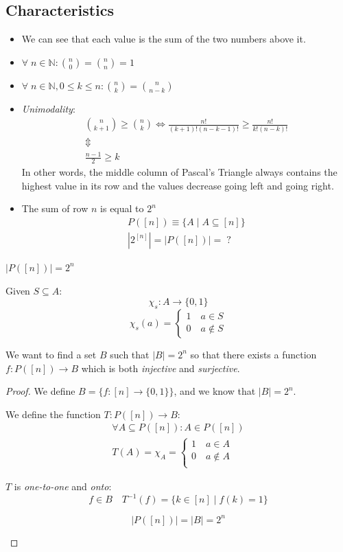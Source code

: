 \documentclass[00_complete]{subfiles}
\begin{document}
\subsection{Characteristics}
\begin{itemize}
    \item We can see that each value is the sum of the two numbers above it.
    \item $\forall \; n \in \mathbb{N}: \binom{n}{0} = \binom{n}{n} = 1$
    \item $\forall \; n \in \mathbb{N}, 0 \leq k \leq n: \binom{n}{k} = \binom{n}{n-k}$
    \item \emph{Unimodality}:
$$
\begin{gathered}
 \binom{n}{k+1} \geq \binom{n}{k} \iff \frac{n!}{(k+1)!(n-k-1)!} \geq \frac{n!}{k!(n-k)!} \\
 \Updownarrow \\
 \frac{n-1}{2} \geq k
\end{gathered}
$$
In other words, the middle column of Pascal's Triangle always contains the
highest value in its row and the values decrease going left and going right.

 \item The sum of row $n$ is equal to $2^n$
$$
\begin{gathered}
    P([n]) \equiv \{A \mid A \subseteq [n]\} \\
    | 2^{[n]}| = |P([n])| = \;?
\end{gathered}
$$
\end{itemize}

\begin{claim}
$|P([n])|=2^n$

Given $S \subseteq A$:
$$\chi_s: A \to \{0,1\}$$
$$\chi_s(a) = \begin{cases}
    1 \quad a \in S \\
    0 \quad a \notin S
\end{cases}$$

We want to find a set $B$ such that $|B|=2^n$ so that there exists a function
$f: P([n]) \to B$ which is both \emph{injective} and \emph{surjective}.
\end{claim}

\begin{proof}
We define $B = \{f:[n] \to \{0,1\}\}$, and we know that $|B|=2^n$.

We define the function $T: P([n]) \to B$:
$$
\begin{gathered}
    \forall A \subseteq P([n]): A \in P([n]) \\
    T(A) = \chi_A = \begin{cases}
        1 \quad a \in A \\
        0 \quad a \notin A \\
    \end{cases}
\end{gathered}
$$

$T$ is \emph{one-to-one} and \emph{onto}:
$$f \in B \quad T^{-1}(f) = \{k \in [n] \mid f(k) = 1\}$$

\begin{conclusion}
$$|P([n])|=|B|=2^n$$
\end{conclusion}
\end{proof}
\end{document}
